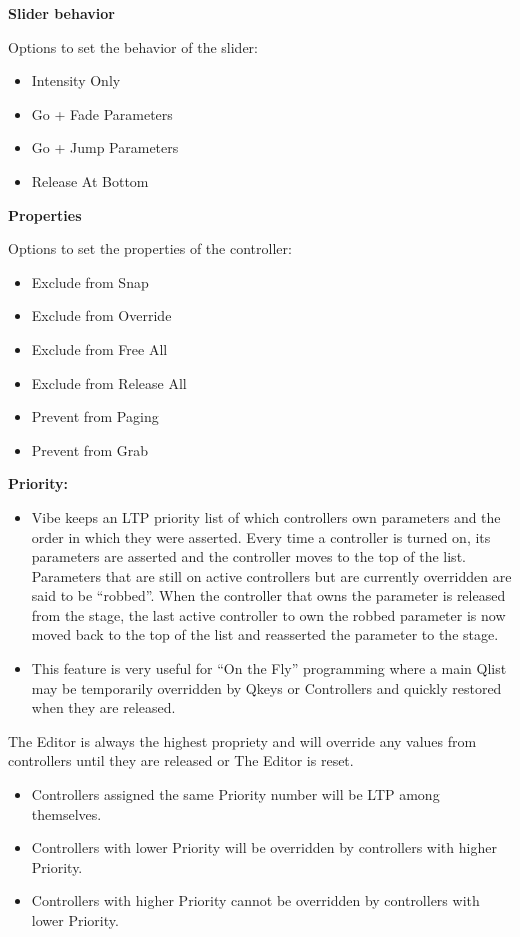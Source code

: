 \documentclass[
]{article}
\begin{document}
\textbf{Slider behavior}

Options to set the behavior of the slider:

\begin{itemize}
\item
  Intensity Only
\item
  Go + Fade Parameters
\item
  Go + Jump Parameters
\item
  Release At Bottom
\end{itemize}

\textbf{Properties}

Options to set the properties of the controller:

\begin{itemize}
\item
  Exclude from Snap
\item
  Exclude from Override
\item
  Exclude from Free All
\item
  Exclude from Release All
\item
  Prevent from Paging
\item
  Prevent from Grab
\end{itemize}

\textbf{Priority:}

\begin{itemize}
\item
  Vibe keeps an LTP priority list of which controllers own parameters and the order in which they were asserted. Every time a controller is turned on, its parameters are asserted and the controller moves to the top of the list. Parameters that are still on active controllers but are currently overridden are said to be ``robbed''. When the controller that owns the parameter is released from the stage, the last active controller to own the robbed parameter is now moved back to the top of the list and reasserted the parameter to the stage.
\item
  This feature is very useful for ``On the Fly'' programming where a main Qlist may be temporarily overridden by Qkeys or Controllers and quickly restored when they are released.
\end{itemize}

{The Editor is always the highest propriety and will override any values from controllers until they are released or The Editor is reset}.

\begin{itemize}
\item
  Controllers assigned the same Priority number will be LTP among themselves.
\item
  Controllers with lower Priority will be overridden by controllers with higher Priority.
\item
  Controllers with higher Priority cannot be overridden by controllers with lower Priority.
\end{itemize}
\end{document}
